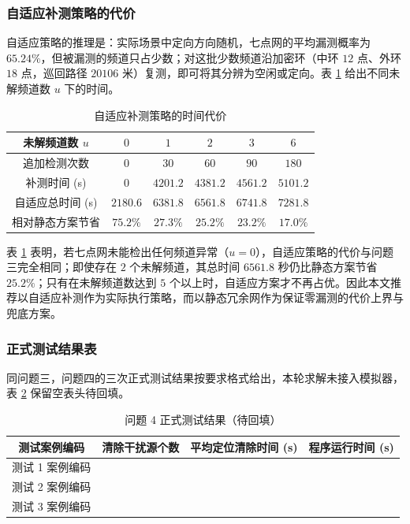 \documentclass[12pt,a4paper]{ctexart}
\begin{document}
\subsubsection{自适应补测策略的代价}

自适应策略的推理是：实际场景中定向方向随机，七点网的平均漏测概率为 $65.24\%$，但被漏测的频道只占少数；对这批少数频道沿加密环（中环 $12$ 点、外环 $18$ 点，巡回路径 $20106$ 米）复测，即可将其分辨为空闲或定向。表 \ref{tab:p4-adapt} 给出不同未解频道数 $u$ 下的时间。

\begin{table}[H]
  \centering
  \caption{自适应补测策略的时间代价}
  \label{tab:p4-adapt}
  \begin{tabular}{cccccc}
    \toprule
    未解频道数 $u$ & $0$ & $1$ & $2$ & $3$ & $6$ \\
    \midrule
    追加检测次数 & $0$ & $30$ & $60$ & $90$ & $180$ \\
    补测时间 (s) & $0$ & $4201.2$ & $4381.2$ & $4561.2$ & $5101.2$ \\
    自适应总时间 (s) & $2180.6$ & $6381.8$ & $6561.8$ & $6741.8$ & $7281.8$ \\
    相对静态方案节省 & $75.2\%$ & $27.3\%$ & $25.2\%$ & $23.2\%$ & $17.0\%$ \\
    \bottomrule
  \end{tabular}
\end{table}

表 \ref{tab:p4-adapt} 表明，若七点网未能检出任何频道异常（$u=0$），自适应策略的代价与问题三完全相同；即使存在 $2$ 个未解频道，其总时间 $6561.8$ 秒仍比静态方案节省 $25.2\%$；只有在未解频道数达到 $5$ 个以上时，自适应方案才不再占优。因此本文推荐以自适应补测作为实际执行策略，而以静态冗余网作为保证零漏测的代价上界与兜底方案。

\subsubsection{正式测试结果表}

同问题三，问题四的三次正式测试结果按要求格式给出，本轮求解未接入模拟器，表 \ref{tab:p4-test} 保留空表头待回填。

\begin{table}[H]
  \centering
  \caption{问题 4 正式测试结果（待回填）}
  \label{tab:p4-test}
  \begin{tabular}{cccc}
    \toprule
    测试案例编码 & 清除干扰源个数 & 平均定位清除时间 (s) & 程序运行时间 (s) \\
    \midrule
    测试 1 案例编码 & & & \\
    测试 2 案例编码 & & & \\
    测试 3 案例编码 & & & \\
    \bottomrule
  \end{tabular}
\end{table}
\end{document}
